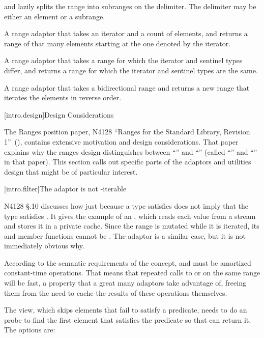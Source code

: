 \begin{itemize}
and lazily splits the range into subranges on the delimiter. The delimiter may
be either an element or a subrange.
{\color{addclr}
\item A  range adaptor that takes an iterator and a count
of elements, and returns a range of that many elements starting at the one
denoted by the iterator.
\item A  range adaptor that takes a range for which the
iterator and sentinel types differ, and returns a range for which the iterator
and sentinel types are the same.
\item A  range adaptor that takes a bidirectional range and
returns a new range that iterates the elements in reverse order.}
\end{itemize}

{\color{addclr}
[intro.design]{Design Considerations}

\pnum
The Ranges position paper, N4128 ``Ranges for the Standard Library,
Revision 1''~(\cite{N4128}), contains extensive motivation and design
considerations. That paper explains why the ranges design distinguishes between
``'' and ``'' (called ``'' and
``'' in that paper). This section calls out specific parts of the
adaptors and utilities design that might be of particular interest. 

[intro.filter]{The  adaptor is not -iterable}

\pnum
N4128 \S{}.10 discusses how just because a type  satisfies  does
not imply that the type  satisfies . It gives the
example of an , which reads each value from a stream and
stores it in a private cache. Since the range is mutated while it is iterated,
its  and  member functions cannot be . The
 adaptor is a similar case, but it is not immediately obvious why.

\pnum
According to the semantic requirements of the  concept, 
and  must be amortized constant-time operations. That means that
repeated calls to  or  on the same range will be fast,
a property that a great many adaptors take advantage of, freeing them from the
need to cache the results of these operations themselves.

\pnum
The  view, which skips elements that fail to satisfy a predicate,
needs to do an  probe to find the first element that satisfies the
predicate so that  can return it. The options are:

}
